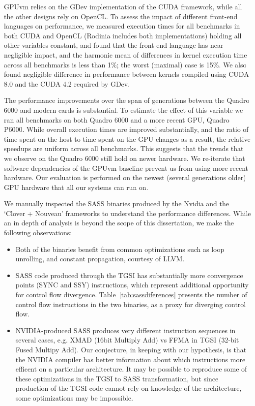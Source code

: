  GPUvm relies on the GDev implementation of the
CUDA framework, while all the other designs rely on OpenCL. To assess the
impact of different front-end languages on performance, we measured execution
times for all benchmarks in both CUDA and OpenCL (Rodinia includes both
implementations) holding all other variables constant, and found that the
front-end language has near negligible impact, and the harmonic mean of
differences in kernel execution time across all benchmarks is less than 1\%;
the worst (maximal) case is 15\%. We also found negligible difference in
performance between kernels compiled using CUDA 8.0 and the CUDA 4.2 required
by GDev.

 The performance improvements over the
span of generations between the Quadro 6000 and modern cards is substantial.
To estimate the effect of this variable we ran all benchmarks on both Quadro
6000 and a more recent GPU, Quadro P6000. While overall execution times are
improved substantially, and the ratio of time spent on the host to time spent
on the GPU changes as a result, the relative speedups are uniform across all
benchmarks. This suggests that the trends that we observe on the Quadro 6000
still hold on newer hardware. We re-iterate that software dependencies of the
GPUvm baseline prevent us from using more recent hardware. Our evaluation is
performed on the newest (several generations older) GPU hardware that all our
systems can run on.

We manually inspected the SASS binaries produced by the Nvidia and the `Clover
+ Nouveau' frameworks to understand the performance differences. While an in
depth of analysis is beyond the scope of this dissertation, we make the
following observations:

\begin{itemize}[nosep, topsep=0em, leftmargin=1em,labelwidth=*,align=left]
\item Both of the binaries benefit from common optimizations such as loop
  unrolling, and constant propagation, courtesy of LLVM.
\item SASS code produced through the TGSI has substantially more convergence
  points (SYNC and SSY) instructions, which represent additional opportunity
  for control flow divergence. Table~\ref{tab:sassdiferences} presents the number of control flow instructions in the two binaries, as a proxy for diverging control flow.
\item NVIDIA-produced SASS produces very different instruction sequences in
  several cases, e.g. XMAD (16bit Multiply Add) vs FFMA in TGSI (32-bit
  Fused Multipy Add). Our conjecture, in keeping with our hypothesis, is
  that the NVIDIA compiler has better information about which instructions
  more efficent on a particular architecture. It may be possible to
  reproduce some of these optimizations in the TGSI to SASS transformation,
  but since production of the TGSI code cannot rely on knowledge of the
  architecture, some optimizations may be impossible.
\end{itemize}
